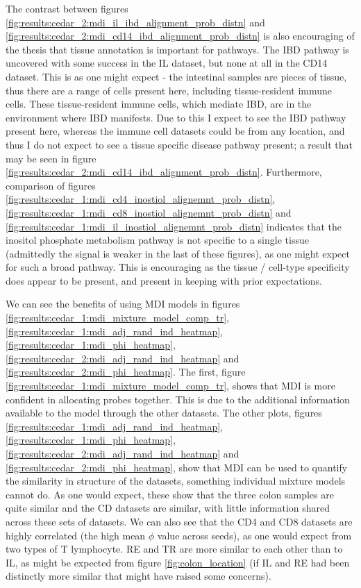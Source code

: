 \documentclass[14pt]{extarticle} %
\begin{document}
	The contrast between figures \ref{fig:results:cedar_2:mdi_il_ibd_alignment_prob_distn} and \ref{fig:results:cedar_2:mdi_cd14_ibd_alignment_prob_distn} is also encouraging of the thesis that tissue annotation is important for pathways. The IBD pathway is uncovered with some success in the IL dataset, but none at all in the CD14 dataset. This is as one might expect - the intestinal samples are pieces of tissue, thus there are a range of cells present here, including tissue-resident immune cells. These tissue-resident immune cells, which mediate IBD, are in the environment where IBD manifests. Due to this I expect to see the IBD pathway present here, whereas the immune cell datasets could be from any location, and thus I do not expect to see a tissue specific disease pathway present; a result that may be seen in figure \ref{fig:results:cedar_2:mdi_cd14_ibd_alignment_prob_distn}. Furthermore, comparison of figures \ref{fig:results:cedar_1:mdi_cd4_inostiol_alignemnt_prob_distn},  \ref{fig:results:cedar_1:mdi_cd8_inostiol_alignemnt_prob_distn} and \ref{fig:results:cedar_1:mdi_il_inostiol_alignemnt_prob_distn} indicates that the inositol phosphate metabolism pathway is not specific to a single tissue (admittedly the signal is weaker in the last of these figures), as one might expect for such a broad pathway. This is encouraging as the tissue / cell-type specificity does appear to be present, and present in keeping with prior expectations.
	
	We can see the benefits of using MDI models in figures \ref{fig:results:cedar_1:mdi_mixture_model_comp_tr}, \ref{fig:results:cedar_1:mdi_adj_rand_ind_heatmap}, \ref{fig:results:cedar_1:mdi_phi_heatmap}, \ref{fig:results:cedar_2:mdi_adj_rand_ind_heatmap} and \ref{fig:results:cedar_2:mdi_phi_heatmap}. The first, figure \ref{fig:results:cedar_1:mdi_mixture_model_comp_tr}, shows that MDI is more confident in allocating probes together. This is due to the additional information available to the model through the other datasets. The other plots, figures \ref{fig:results:cedar_1:mdi_adj_rand_ind_heatmap}, \ref{fig:results:cedar_1:mdi_phi_heatmap}, \ref{fig:results:cedar_2:mdi_adj_rand_ind_heatmap} and \ref{fig:results:cedar_2:mdi_phi_heatmap}, show that MDI can be used to quantify the similarity in structure of the datasets, something individual mixture models cannot do. As one would expect, these show that the three colon samples are quite similar and the CD datasets are similar, with little information shared across these sets of datasets. We can also see that the CD4 and CD8 datasets are highly correlated (the high mean $\phi$ value across seeds), as one would expect from two types of T lymphocyte. RE and TR are more similar to each other than to IL, as might be expected from figure \ref{fig:colon_location} (if IL and RE had been distinctly more similar that might have raised some concerns).
	
\end{document}
